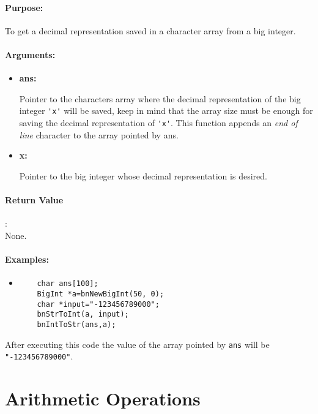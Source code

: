 \documentclass{book}
\begin{document}
\paragraph{Purpose:} 

To get a decimal representation saved in a character array from a big integer.

\paragraph{Arguments:}

\begin{itemize}
\item{\bf ans:}

Pointer to the characters array where the decimal representation of the big integer \verb+'x'+ will be saved, keep in mind that the array size must be enough for saving the decimal representation of \verb+'x'+. This  function appends an \emph{end of line} character to the array pointed by ans.

\item {\bf x:}

Pointer to the big integer whose decimal representation is desired.

\end{itemize}

\paragraph{Return Value}:\\

None.

\paragraph{Examples:}

\begin{itemize}
\item

\begin{verbatim}
	char ans[100];
	BigInt *a=bnNewBigInt(50, 0);
	char *input="-123456789000";
	bnStrToInt(a, input);
	bnIntToStr(ans,a);
\end{verbatim}
\end{itemize}

After executing this code the value of the array pointed by \verb+ans+ will be \verb+"-123456789000"+.

\section{Arithmetic Operations}
\end{document}
